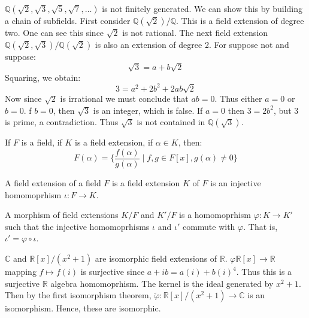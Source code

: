     \begin{example}
        $\mathbb{Q}(\sqrt{2},\sqrt{3},\sqrt{5},\sqrt{7},\dots)$ is not
        finitely generated. We can show this by building a chain of
        subfields. First consider $\mathbb{Q}(\sqrt{2})/\mathbb{Q}$. This
        is a field extension of degree two. One can see this since
        $\sqrt{2}$ is not rational. The next field extension
        $\mathbb{Q}(\sqrt{2},\sqrt{3})/\mathbb{Q}(\sqrt{2})$ is also an
        extension of degree 2. For suppose not and suppose:
        \begin{equation}
            \sqrt{3}=a+b\sqrt{2}
        \end{equation}
        Squaring, we obtain:
        \begin{equation}
            3=a^{2}+2b^{2}+2ab\sqrt{2}
        \end{equation}
        Now since $\sqrt{2}$ is irrational we must conclude that $ab=0$.
        Thus either $a=0$ or $b=0$. f $b=0$, then $\sqrt{3}$ is an integer,
        which is false. If $a=0$ then $3=2b^{2}$, but $3$ is prime, a
        contradiction. Thus $\sqrt{3}$ is not contained in
        $\mathbb{Q}(\sqrt{3})$.
    \end{example}
    \begin{theorem}
        If $F$ is a field, if $K$ is a field extension, if $\alpha\in{K}$,
        then:
        \begin{equation}
            F(\alpha)=\big\{\frac{f(\alpha)}{g(\alpha)}\;|\;
                f,g\in{F}[x],g(\alpha)\ne{0}\big\}
        \end{equation}
    \end{theorem}
    \begin{theorem}
        A field extension of a field $F$ is a field extension $K$ of $F$
        is an injective homomoprhism $\iota:F\rightarrow{K}$.
    \end{theorem}
    \begin{definition}
        A morphism of field extensions $K/F$ and $K'/F$ is a homomoprhism
        $\varphi:K\rightarrow{K}'$ such that the injective homomoprhisms
        $\iota$ and $\iota'$ commute with $\varphi$. That is,
        $\iota'=\varphi\circ\iota$.
    \end{definition}
    \begin{example}
        $\mathbb{C}$ and $\mathbb{R}[x]/(x^{2}+1)$ are isomorphic field
        extensions of $\mathbb{R}$.
        $\varphi\mathbb{R}[x]\rightarrow\mathbb{R}$ mapping
        $f\mapsto{f}(i)$ is surjective since $a+ib=a(i)+b(i)^{4}$. Thus this
        is a surjective $\mathbb{R}$ algebra homomoprhism. The kernel is
        the ideal generated by $x^{2}+1$. Then by the first isomorphism
        theorem,
        $\tilde{\varphi}:\mathbb{R}[x]/(x^{2}+1)\rightarrow\mathbb{C}$ is an
        isomorphism. Hence, these are isomorphic.
    \end{example}
